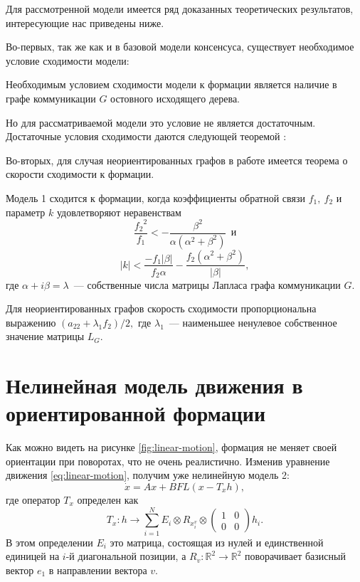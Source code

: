 Для рассмотренной модели имеется ряд доказанных теоретических результатов, интересующие нас приведены ниже. 

Во-первых, так же как и в базовой модели консенсуса, существует необходимое условие сходимости модели:
\begin{proposition}
Необходимым условием сходимости модели к формации является наличие в графе коммуникации $G$ остовного исходящего дерева.
\end{proposition}

Но для рассматриваемой модели это условие не является достаточным. Достаточные условия сходимости даются следующей теоремой \cite{veerman2005flocks,lafferriere2005decentralized}:

Во-вторых, для случая неориентированных графов в работе \cite{lafferriere2005decentralized} имеется теорема о скорости сходимости к формации.
\begin{theorem}
Модель 1 сходится к формации, когда коэффициенты обратной связи $f_1,\ f_2$ и параметр $k$ удовлетворяют неравенствам 
\begin{equation}
\frac{{f_2}^2}{f_1}< -\frac{\beta^2}{\alpha(\alpha^2+\beta^2)}\ \ \text{и}
\end{equation}
\begin{equation}
|k|<\frac{-f_1|\beta|}{f_2\alpha}-\frac{f_2(\alpha^2+\beta^2)}{|\beta|},
\end{equation}
где $\alpha+i\beta=\lambda$~--- собственные числа матрицы Лапласа графа коммуникации $G$.
\end{theorem}

\begin{theorem}
Для неориентированных графов скорость сходимости пропорциональна выражению 
$(a_22+\lambda_1 f_2)/2,$ где $\lambda_1$~--- наименьшее ненулевое собственное значение матрицы $L_G$.
\end{theorem}

\section{Нелинейная модель движения в ориентированной формации}
Как можно видеть на рисунке \ref{fig:linear-motion}, формация не меняет своей ориентации при поворотах, что не очень реалистично. Изменив уравнение движения \ref{eq:linear-motion}, получим уже нелинейную модель 2:
\begin{equation}
\dot{x}=Ax+BFL(x-T_x h),
\label{eq:orientable-motion}
\end{equation}
где оператор $T_x$ определен как
\begin{equation}
T_x:h\rightarrow \sum^N_{i=1}E_i\otimes R_{x^v_i}\otimes
\left( 
\begin{array}{cc}
1 & 0 \\
0 & 0 \end{array} \right) h_i.
\end{equation}
В этом определении $E_i$ это матрица, состоящая из нулей и единственной единицей на $i$-й диагональной позиции, а $R_v:\mathbb{R}^2\rightarrow\mathbb{R}^2$ поворачивает базисный вектор $e_1$ в направлении вектора $v$.

